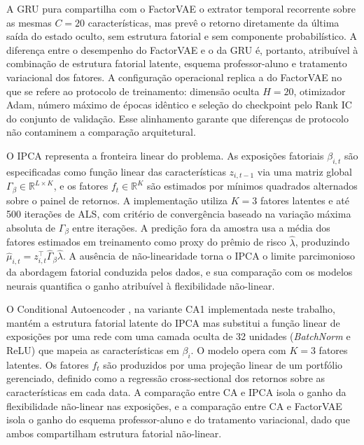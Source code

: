 A GRU pura compartilha com o FactorVAE o extrator temporal recorrente sobre as mesmas
$C = 20$ características, mas prevê o retorno diretamente da última saída do estado
oculto, sem estrutura fatorial e sem componente probabilístico. A diferença entre o
desempenho do FactorVAE e o da GRU é, portanto, atribuível à combinação de estrutura
fatorial latente, esquema professor-aluno e tratamento variacional dos fatores. A
configuração operacional replica a do FactorVAE no que se refere ao protocolo de
treinamento: dimensão oculta $H = 20$, otimizador Adam, número máximo de épocas
idêntico e seleção do checkpoint pelo Rank IC do conjunto de validação. Esse
alinhamento garante que diferenças de protocolo não contaminem a comparação
arquitetural.

O IPCA \parencite{kelly2019} representa a fronteira linear do problema. As exposições
fatoriais $\beta_{i,t}$ são especificadas como função linear das características
$z_{i,t-1}$ via uma matriz global $\Gamma_\beta \in \mathbb{R}^{L \times K}$, e os
fatores $f_t \in \mathbb{R}^K$ são estimados por mínimos quadrados alternados sobre o
painel de retornos. A implementação utiliza $K = 3$ fatores latentes e até 500
iterações de ALS, com critério de convergência baseado na variação máxima absoluta de
$\Gamma_\beta$ entre iterações. A predição fora da amostra usa a média dos fatores
estimados em treinamento como proxy do prêmio de risco $\hat{\lambda}$, produzindo
$\hat{\mu}_{i,t} = z_{i,t}^\top \hat{\Gamma}_\beta \hat{\lambda}$. A ausência de
não-linearidade torna o IPCA o limite parcimonioso da abordagem fatorial conduzida
pelos dados, e sua comparação com os modelos neurais quantifica o ganho atribuível à
flexibilidade não-linear.

O Conditional Autoencoder \parencite{gu2021}, na variante CA1 implementada neste
trabalho, mantém a estrutura fatorial latente do IPCA mas substitui a função linear de
exposições por uma rede com uma camada oculta de 32 unidades (\textit{BatchNorm} e
ReLU) que mapeia as características em $\beta_i$. O modelo opera com $K = 3$ fatores
latentes. Os fatores $f_t$ são produzidos por uma projeção linear de um portfólio
gerenciado, definido como a regressão cross-sectional dos retornos sobre as
características em cada data. A comparação entre CA e IPCA isola o ganho da
flexibilidade não-linear nas exposições, e a comparação entre CA e FactorVAE isola o
ganho do esquema professor-aluno e do tratamento variacional, dado que ambos
compartilham estrutura fatorial não-linear.

